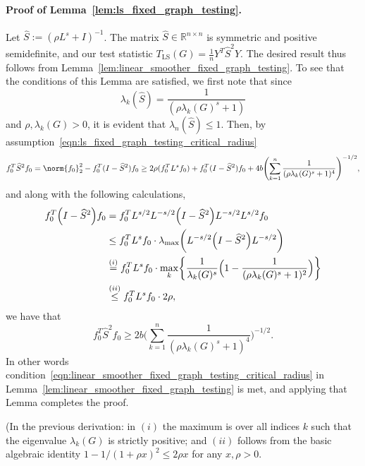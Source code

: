 \documentclass{article}
\newcommand{\Reals}{\mathbb{R}}
\newcommand{\1}{\mathbf{1}}
\newcommand{\Lap}{L}
\newcommand{\Id}{I}
\newcommand{\wh}[1]{\widehat{#1}}
\newcommand{\LS}{\mathrm{LS}}
\theoremstyle{alden}
\theoremstyle{aldenthm}
\theoremstyle{definition}
\theoremstyle{remark}
\begin{document}
\paragraph{Proof of Lemma~\ref{lem:ls_fixed_graph_testing}.}
Let $\wh{S} := (\rho \Lap^s + \Id)^{-1}$. The matrix $\wh{S} \in \Reals^{n \times n}$ is symmetric and positive semidefinite, and our test statistic $T_{\LS}(G) = \frac{1}{n}Y^T \wh{S}^2 Y$. The desired result thus follows from Lemma~\ref{lem:linear_smoother_fixed_graph_testing}. To see that the conditions of this Lemma are satisfied, we first note that since
\begin{equation*}
\lambda_k(\wh{S}) = \frac{1}{(\rho\lambda_k(G)^s + 1)}
\end{equation*}
and $\rho, \lambda_k(G) > 0$, it is evident that $\lambda_{n}(\wh{S}) \leq 1$.  Then, by assumption~\eqref{eqn:ls_fixed_graph_testing_critical_radius}
\begin{equation*}
f_0^{T} \wh{S}^2 f_0 = \norm{f_0}_2^2 - f_0^T(I - \wh{S}^2)f_0 \geq 2 \rho (f_0^T \Lap^s f_0) + f_0^T(I - \wh{S}^2)f_0 + 4b \Biggl(\sum_{k = 1}^{n} \frac{1}{(\rho\lambda_k(G)^s + 1)^4} \Biggr)^{-1/2},
\end{equation*}
and along with the following calculations,
\begin{equation*}
\begin{aligned}
f_0^T \Bigl(\Id - \wh{S}^2\Bigr) f_0  & = f_0^T L^{s/2} L^{-s/2}\Bigl(\Id - \wh{S}^2\Bigr) L^{-s/2} L^{s/2} f_0 \\ 
& \leq f_0^T L^{s} f_0 \cdot  \lambda_{\max}\biggl(L^{-s/2}\Bigl(\Id - \wh{S}^2\Bigr) L^{-s/2}\biggr) \\ 
& \overset{(i)}{=}  f_0^T L^{s} f_0 \cdot \max_{k} \biggl\{ \frac{1}{\lambda_k(G)^s} \Bigl(1 - \frac{1}{(\rho \lambda_k(G)^s + 1)^2}\Bigr) \biggr\} \\
& \overset{(ii)}{\leq} f_0^T L^{s} f_0 \cdot 2\rho,
\end{aligned}
\end{equation*}
we have that
\begin{equation*}
f_0^{T} \wh{S}^2 f_0 \geq 2b \biggl(\sum_{k = 1}^{n} \frac{1}{(\rho\lambda_k(G)^s + 1)^4} \biggr)^{-1/2}.
\end{equation*} 
In other words condition~\eqref{eqn:linear_smoother_fixed_graph_testing_critical_radius} in Lemma~\ref{lem:linear_smoother_fixed_graph_testing} is met, and applying that Lemma completes the proof.

(In the previous derivation: in $(i)$ the maximum is over all indices $k$ such that the eigenvalue $\lambda_k(G)$ is strictly positive; and $(ii)$ follows from the basic algebraic identity $1 - 1/(1 + \rho x)^2 \leq 2 \rho x$ for any $x, \rho > 0$.
\end{document}
